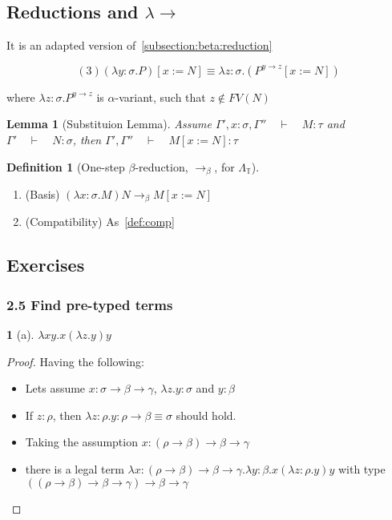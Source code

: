 \documentclass[12pt, a4paper]{article}
\newcommand{\onebeta}{\to_\beta}
\newcommand{\deriv}{\quad\vdash\quad}
\newtheorem{definition}{Definition}[section]
\newtheorem{lemma}{Lemma}[section]
\newtheorem*{exercise}{}
\begin{document}
\subsection{Reductions and \texorpdfstring{$\lambda\to$}{Lg}}
It is an adapted version of~\ref{subsection:beta:reduction}

\begin{equation}
    (3) (\lambda y : \sigma . P)[x := N] \equiv \lambda z : \sigma . (P^{y \to z}[x := N])
\end{equation}

where $\lambda z : \sigma. P^{y \to z}$ is $\alpha$-variant, such that $z \notin FV(N)$

\begin{lemma}[Substituion Lemma]
    Assume $\Gamma', x : \sigma, \Gamma'' \deriv M : \tau$ and $\Gamma' \deriv N : \sigma$, then $\Gamma', \Gamma'' \deriv M[x := N] : \tau$
\end{lemma}

\begin{definition}[One-step $\beta$-reduction, $\onebeta$, for $\Lambda_{\mathbb{T}}$]
\end{definition}
\begin{enumerate}
    \item (Basis) $(\lambda x : \sigma . M)N \onebeta M [x := N]$
    \item (Compatibility) As~\ref{def:comp}
\end{enumerate}

\subsection{Exercises}
\subsubsection{2.5 Find pre-typed terms}
\begin{exercise}[a]
    $\lambda xy. x(\lambda z. y)y$
\end{exercise}
\begin{proof}
    Having the following:
    \begin{itemize}
        \item Lets assume $x : \sigma \to \beta \to \gamma$, $\lambda z. y : \sigma$ and $y : \beta$
        \item If $z : \rho$, then $\lambda z : \rho. y : \rho \to \beta \equiv \sigma$ should hold.
        \item Taking the assumption $x : (\rho \to \beta) \to \beta \to \gamma$ 
        \item there is a legal term $\lambda x: (\rho \to \beta) \to \beta \to \gamma. \lambda y : \beta. x(\lambda z : \rho . y)y$ with type $((\rho \to \beta) \to \beta \to \gamma) \to \beta \to \gamma$
    \end{itemize}
\end{proof}
\end{document}
